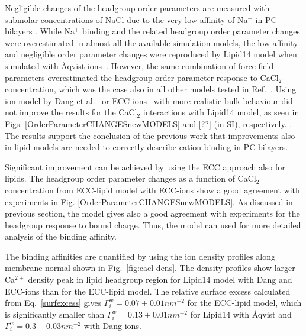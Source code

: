 \documentclass[aip,jcp,twocolumn]{revtex4}
\begin{document}

Negligible changes of the headgroup order parameters are measured
with submolar concentrations of NaCl due to the very low affinity of Na$^+$
in PC bilayers \cite{akutsu81}. While Na$^+$ binding and the related 
headgroup order parameter changes were overestimated in
almost all the available simulation models, the low affinity
and negligible order parameter changes were reproduced by Lipid14 
model when simulated with \AA{}qvist ions~\cite{catte16}.
However, the same combination of force field parameters
overestimated the headgroup order parameter response to CaCl$_2$ 
concentration, which was the case also in all other models tested in
Ref.~.
Using ion model by Dang et al.~\cite{smith94,chang1999,dang2006} or
ECC-ions~\cite{jungwirth17-new-paper-to-be-published, kohagen16, Pluharova2014}
with more realistic bulk behaviour did not improve the results
for the CaCl$_2$ interactions with Lipid14 model, as seen 
in Figs. \ref{OrderParameterCHANGESnewMODELS} and \ref{??} (in SI), respectively.
.
The results support the conclusion of the previous work \cite{catte16}
that improvements also in lipid models are needed to 
correctly describe cation binding in PC bilayers.

Significant improvement can be achieved by using the ECC
approach also for lipids. The headgroup order parameter changes
as a function of CaCl$_2$ concentration from ECC-lipid model with ECC-ions
show a good agreement with experiments in Fig. \ref{OrderParameterCHANGESnewMODELS}.
As discussed in previous section, the model gives also
a good agreement with experiments for
the headgroup response to bound charge.
Thus, the model can used for more detailed analysis of the
binding affinity.


The binding affinities are quantified by using
the ion density profiles along membrane normal shown
in Fig.~\ref{fig:cacl-dens}. The density profiles show
larger Ca$^{2+}$ density peak in lipid headgroup region for
Lipid14 model with Dang and ECC-ions than for the ECC-lipid model.
The relative surface excess calculated from Eq.~\ref{surfexcess} gives 
$\Gamma_i^w = 0.07 \pm 0.01 nm^{-2}$ for the ECC-lipid model,
which is significantly smaller than $\Gamma_i^w = 0.13 \pm 0.01 nm^{-2}$ for
Lipid14 with \AA{}qvist and $\Gamma_i^w = 0.3 \pm 0.03 nm^{-2}$ with Dang ions.
\end{document}
